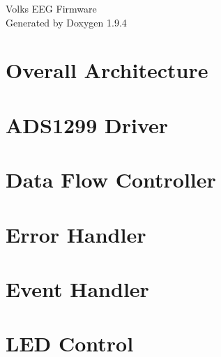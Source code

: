 \documentclass[twoside]{book}
\newcommand{\+}{\discretionary{\mbox{\scriptsize$\hookleftarrow$}}{}{}}
\newcommand{\clearemptydoublepage}{%
    \newpage{\pagestyle{empty}\cleardoublepage}%
  }
\begin{document}
  \raggedbottom
    \hypersetup{pageanchor=false,
                bookmarksnumbered=true,
                pdfencoding=unicode
               }
  \begin{titlepage}
  \vspace*{7cm}
  \begin{center}%
  {\Large Volks EEG Firmware}\\
  \vspace*{1cm}
  {\large Generated by Doxygen 1.9.4}\\
  \end{center}
  \end{titlepage}
  \clearemptydoublepage
  \tableofcontents
  \clearemptydoublepage
  \hypersetup{pageanchor=true}
\chapter{Overall Architecture}
\label{md_src__r_e_a_d_m_e}

\chapter{ADS1299 Driver}
\label{md_lib_ads1299_driver__r_e_a_d_m_e}

\chapter{Data Flow Controller}
\label{md_lib_data_flow_controller__r_e_a_d_m_e}

\chapter{Error Handler}
\label{md_lib_error_handler__r_e_a_d_m_e}

\chapter{Event Handler}
\label{md_lib_event_handler__r_e_a_d_m_e}

\chapter{LED Control}
\label{md_lib_led_control__r_e_a_d_m_e}

\end{document}
